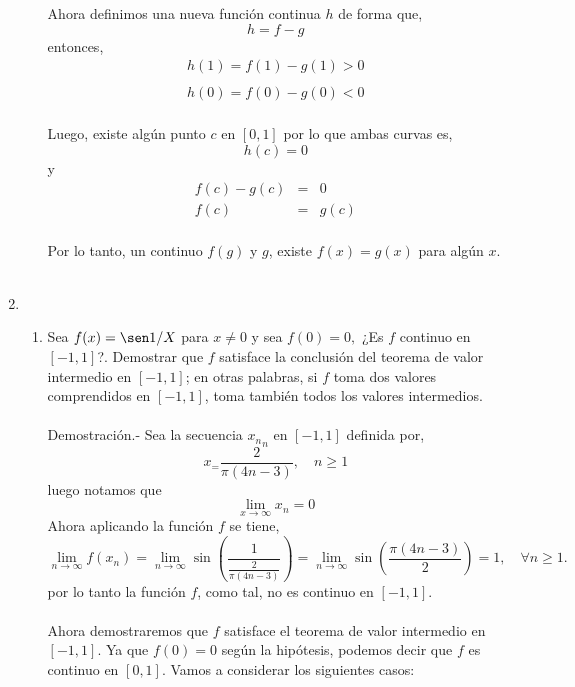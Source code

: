 \begin{enumerate}
\begin{enumerate}[\bfseries (a)]
	    Ahora definimos una nueva función continua $h$ de forma que,
	    $$h=f-g$$
	    entonces,
	    $$\begin{array}{l}
		h(1)=f(1)-g(1)>0\\\\
		h(0)=f(0)-g(0)<0\\
	    \end{array}$$
	    
	    Luego, existe algún punto $c$ en $[0,1]$ por lo que ambas curvas es,
	    $$h(c)=0$$
	    y 
	    $$\begin{array}{rcl}
		f(c)-g(c)&=&0\\
		f(c)&=&g(c)\\
	    \end{array}$$

	    Por lo tanto, un continuo $f(g)$ y $g$, existe $f(x)=g(x)$ para algún $x$.\\\\

    \end{enumerate}

\item 
    \begin{enumerate}[\bfseries (a)]

	\item Sea $f(x)=\sen 1/X$ para $x\neq 0$ y sea $f(0)=0,$ ¿Es $f$ continuo en $[-1,1]$?. Demostrar que $f$ satisface la conclusión del teorema de valor intermedio en $[-1,1]$; en otras palabras, si $f$ toma dos valores comprendidos en $[-1,1]$, toma también todos los valores intermedios.\\\\
	    Demostración.-\; Sea la secuencia ${x_n}_n$ en $[-1,1]$ definida por,
	    $$x_ = \dfrac{2}{\pi(4n-3)},\quad n\geq 1$$
	    luego notamos que 
	    $$\lim_{x\to \infty} x_n = 0$$
	    Ahora aplicando la función $f$ se tiene,
	    $$\lim_{n\to \infty}f(x_n) = \lim_{n\to \infty}\sin\left(\dfrac{1}{\frac{2}{\pi(4n-3)}}\right) = \lim_{n\to \infty}\sin\left(\dfrac{\pi(4n-3)}{2}\right) = 1, \quad \forall n\geq 1.$$
	    por lo tanto la función $f$, como tal, no es continuo en $[-1,1]$.\\\\
	    Ahora demostraremos que $f$ satisface el teorema de valor intermedio en $[-1,1]$. Ya que $f(0)=0$ según la hipótesis, podemos decir que $f$ es continuo en $[0,1]$. Vamos a considerar los siguientes casos:\\


\end{enumerate}
\end{enumerate}
